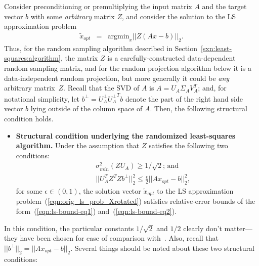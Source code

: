 \documentclass[twoside]{article}
\begin{document}
Consider preconditioning or premultiplying the input matrix $A$ and the 
target vector $b$ with some \emph{arbitrary} matrix $Z$,
and consider the solution to the LS approximation problem
\begin{eqnarray}
\label{eqn:orig_ls_prob_Xrotated}
\tilde{x}_{opt} &=& \mbox{argmin}_x ||Z(Ax-b)||_2   .
\end{eqnarray}
Thus, for the random sampling algorithm described in 
Section~\ref{sxn:least-squares:algorithm}, the matrix $Z$ is a 
carefully-constructed data-dependent random sampling matrix, and for the 
random projection algorithm below it is a data-independent random 
projection, but more generally it could be \emph{any} arbitrary 
matrix~$Z$.
Recall that the SVD of $A$ is $A=U_A\Sigma_AV_A^T$; 
and, for notational simplicity, let 
$b^{\perp} = U_A^{\perp}{U_A^{\perp}}^{T}b$ denote the  part of the right 
hand side vector $b$ lying outside of the column space of $A$.
Then, the following structural condition holds.
\begin{itemize}
\item
\textbf{Structural condition underlying the randomized least-squares 
algorithm.}
Under the assumption that $Z$ satisfies the following two conditions:
\begin{eqnarray}
\label{eqn:lemma1_ass1}
& & \sigma_{min}^2 \left( ZU_A \right) \ge 1/\sqrt{2} \mbox{; and}  \\
\label{eqn:lemma1_ass2} & &
||U_A^TZ^TZb^{\perp}||_2^2
\le \frac{\epsilon}{2} ||Ax_{opt}-b||_2^2  ,
\end{eqnarray}
for some $\epsilon \in (0,1)$,
the solution vector $\tilde{x}_{opt}$ to the LS approximation 
problem~(\ref{eqn:orig_ls_prob_Xrotated})
satisfies relative-error bounds of the form~(\ref{eqn:ls-bound-eq1})
and~(\ref{eqn:ls-bound-eq2}).
\end{itemize}
In this condition, the particular constants $1/\sqrt{2}$ and $1/2$ clearly 
don't matter---they have been chosen for ease of comparison 
with~\cite{DMMS07_FastL2_NM10}.  
Also, recall that $||b^{\perp}||_2=||Ax_{opt}-b||_2$.
Several things should be noted about these two structural conditions:
\end{document}
